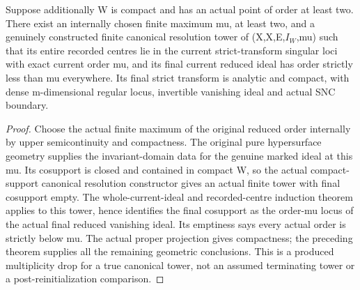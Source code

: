 \begin{theorem}
\label{hir:constructed-multiplicity-drop-phase}
\leanok
Suppose additionally W is compact and has an actual point of order at
least two. There exist an internally chosen finite maximum mu, at least
two, and a genuinely constructed finite canonical resolution tower of
(X,X,E,$I_W$,mu) such that its entire recorded centres lie in the current
strict-transform singular loci with exact current order mu, and its
final current reduced ideal has order strictly less than mu everywhere.
Its final strict transform is analytic and compact, with dense
m-dimensional regular locus, invertible vanishing ideal and actual SNC
boundary.
\end{theorem}
\begin{proof}
Choose the actual finite maximum of the original reduced order internally
by upper semicontinuity and compactness. The original pure hypersurface
geometry supplies the invariant-domain data for the genuine marked
ideal at this mu. Its cosupport is closed and contained in compact W,
so the actual compact-support canonical resolution constructor gives
an actual finite tower with final cosupport empty. The whole-current-ideal
and recorded-centre induction theorem applies to this tower, hence
identifies the final cosupport as the order-mu locus of the actual
final reduced vanishing ideal. Its emptiness says every actual order
is strictly below mu. The actual proper projection gives compactness;
the preceding theorem supplies all the remaining geometric conclusions.
This is a produced multiplicity drop for a true canonical tower, not an
assumed terminating tower or a post-reinitialization comparison.
\end{proof}

